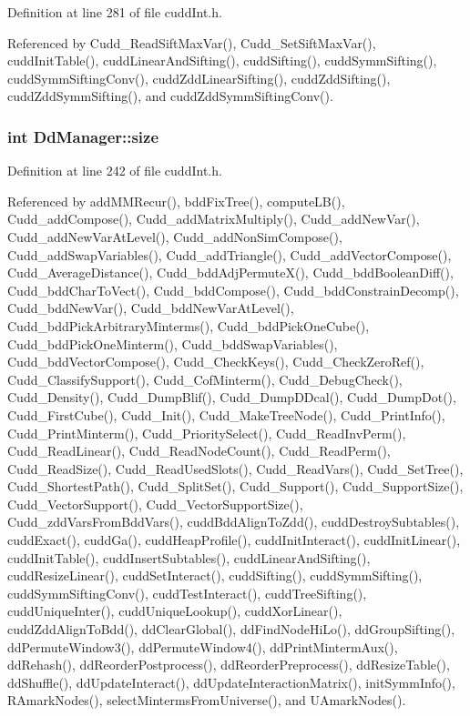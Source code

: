 Definition at line 281 of file cudd\-Int.h.

Referenced by Cudd\_\-Read\-Sift\-Max\-Var(), Cudd\_\-Set\-Sift\-Max\-Var(), cudd\-Init\-Table(), cudd\-Linear\-And\-Sifting(), cudd\-Sifting(), cudd\-Symm\-Sifting(), cudd\-Symm\-Sifting\-Conv(), cudd\-Zdd\-Linear\-Sifting(), cudd\-Zdd\-Sifting(), cudd\-Zdd\-Symm\-Sifting(), and cudd\-Zdd\-Symm\-Sifting\-Conv().
\subsubsection{\setlength{\rightskip}{0pt plus 5cm}int \bf{Dd\-Manager::size}}\label{structDdManager_5fc169bc41431f1a0645f64c753457e3}




Definition at line 242 of file cudd\-Int.h.

Referenced by add\-MMRecur(), bdd\-Fix\-Tree(), compute\-LB(), Cudd\_\-add\-Compose(), Cudd\_\-add\-Matrix\-Multiply(), Cudd\_\-add\-New\-Var(), Cudd\_\-add\-New\-Var\-At\-Level(), Cudd\_\-add\-Non\-Sim\-Compose(), Cudd\_\-add\-Swap\-Variables(), Cudd\_\-add\-Triangle(), Cudd\_\-add\-Vector\-Compose(), Cudd\_\-Average\-Distance(), Cudd\_\-bdd\-Adj\-Permute\-X(), Cudd\_\-bdd\-Boolean\-Diff(), Cudd\_\-bdd\-Char\-To\-Vect(), Cudd\_\-bdd\-Compose(), Cudd\_\-bdd\-Constrain\-Decomp(), Cudd\_\-bdd\-New\-Var(), Cudd\_\-bdd\-New\-Var\-At\-Level(), Cudd\_\-bdd\-Pick\-Arbitrary\-Minterms(), Cudd\_\-bdd\-Pick\-One\-Cube(), Cudd\_\-bdd\-Pick\-One\-Minterm(), Cudd\_\-bdd\-Swap\-Variables(), Cudd\_\-bdd\-Vector\-Compose(), Cudd\_\-Check\-Keys(), Cudd\_\-Check\-Zero\-Ref(), Cudd\_\-Classify\-Support(), Cudd\_\-Cof\-Minterm(), Cudd\_\-Debug\-Check(), Cudd\_\-Density(), Cudd\_\-Dump\-Blif(), Cudd\_\-Dump\-DDcal(), Cudd\_\-Dump\-Dot(), Cudd\_\-First\-Cube(), Cudd\_\-Init(), Cudd\_\-Make\-Tree\-Node(), Cudd\_\-Print\-Info(), Cudd\_\-Print\-Minterm(), Cudd\_\-Priority\-Select(), Cudd\_\-Read\-Inv\-Perm(), Cudd\_\-Read\-Linear(), Cudd\_\-Read\-Node\-Count(), Cudd\_\-Read\-Perm(), Cudd\_\-Read\-Size(), Cudd\_\-Read\-Used\-Slots(), Cudd\_\-Read\-Vars(), Cudd\_\-Set\-Tree(), Cudd\_\-Shortest\-Path(), Cudd\_\-Split\-Set(), Cudd\_\-Support(), Cudd\_\-Support\-Size(), Cudd\_\-Vector\-Support(), Cudd\_\-Vector\-Support\-Size(), Cudd\_\-zdd\-Vars\-From\-Bdd\-Vars(), cudd\-Bdd\-Align\-To\-Zdd(), cudd\-Destroy\-Subtables(), cudd\-Exact(), cudd\-Ga(), cudd\-Heap\-Profile(), cudd\-Init\-Interact(), cudd\-Init\-Linear(), cudd\-Init\-Table(), cudd\-Insert\-Subtables(), cudd\-Linear\-And\-Sifting(), cudd\-Resize\-Linear(), cudd\-Set\-Interact(), cudd\-Sifting(), cudd\-Symm\-Sifting(), cudd\-Symm\-Sifting\-Conv(), cudd\-Test\-Interact(), cudd\-Tree\-Sifting(), cudd\-Unique\-Inter(), cudd\-Unique\-Lookup(), cudd\-Xor\-Linear(), cudd\-Zdd\-Align\-To\-Bdd(), dd\-Clear\-Global(), dd\-Find\-Node\-Hi\-Lo(), dd\-Group\-Sifting(), dd\-Permute\-Window3(), dd\-Permute\-Window4(), dd\-Print\-Minterm\-Aux(), dd\-Rehash(), dd\-Reorder\-Postprocess(), dd\-Reorder\-Preprocess(), dd\-Resize\-Table(), dd\-Shuffle(), dd\-Update\-Interact(), dd\-Update\-Interaction\-Matrix(), init\-Symm\-Info(), RAmark\-Nodes(), select\-Minterms\-From\-Universe(), and UAmark\-Nodes().
